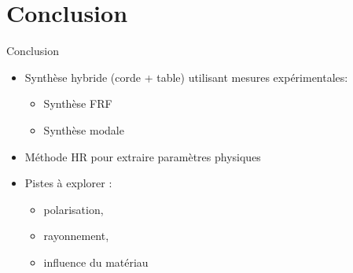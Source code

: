 \section*{Conclusion}
\begin{frame}{Conclusion}

	\begin{itemize}
    \item Synthèse hybride (corde + table) utilisant mesures expérimentales:
        \begin{itemize}
          \item Synthèse FRF 
          \item Synthèse modale
        \end{itemize}
	  \item Méthode HR pour extraire paramètres physiques
	  \item Pistes à explorer : 
        \begin{itemize}
          \item polarisation,
          \item rayonnement,
          \item influence du matériau
        \end{itemize}	\end{itemize}

\end{frame}
